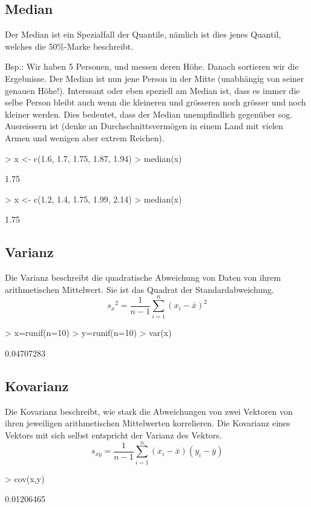 \subsection{Median}
Der Median ist ein Spezialfall der Quantile, nämlich ist dies jenes Quantil,
welches die 50\%-Marke beschreibt.

Bsp.: Wir haben 5 Personen, und messen deren Höhe. Danach sortieren wir die
Ergebnisse. Der Median ist nun jene Person in der Mitte (unabhängig von seiner
genauen Höhe!). Interssant oder eben speziell am Median ist,
dass es immer die selbe Person bleibt auch wenn die kleineren und grösseren
noch grösser und noch kleiner werden. Dies bedeutet, dass der Median 
unempfindlich gegenüber sog. Ausreissern ist (denke an Durchschnittsvermögen
in einem Land mit vielen Armen und wenigen aber extrem Reichen).
\begin{Schunk}
\begin{Sinput}
> x <- c(1.6, 1.7, 1.75, 1.87, 1.94)
> median(x)
\end{Sinput}
\begin{Soutput}
[1] 1.75
\end{Soutput}
\begin{Sinput}
> x <- c(1.2, 1.4, 1.75, 1.99, 2.14)
> median(x)
\end{Sinput}
\begin{Soutput}
[1] 1.75
\end{Soutput}
\end{Schunk}

\subsection{Varianz}
Die Varianz beschreibt die quadratische Abweichung von Daten von ihrem 
arithmetischen Mittelwert. Sie ist das Quadrat der Standardabweichung. 
\[ {s_x}^2 = \frac{1}{n-1} \sum\limits_{i=1}^{n} (x_i - \bar{x})^2 \]
\begin{Schunk}
\begin{Sinput}
> x=runif(n=10)
> y=runif(n=10)
> var(x)
\end{Sinput}
\begin{Soutput}
[1] 0.04707283
\end{Soutput}
\end{Schunk}

\subsection{Kovarianz}
Die Kovarianz beschreibt, wie stark die Abweichungen von zwei Vektoren von 
ihren jeweiligen arithmetischen Mittelwerten korrelieren. Die Kovarianz 
eines Vektors mit sich selbst entspricht der Varianz des Vektors. 
\[ s_{xy} 
= \frac{1}{n-1} \sum\limits_{i=1}^{n} (x_i - \bar{x}) (y_i - \bar{y}) \]
\begin{Schunk}
\begin{Sinput}
> cov(x,y)
\end{Sinput}
\begin{Soutput}
[1] 0.01206465
\end{Soutput}
\end{Schunk}

